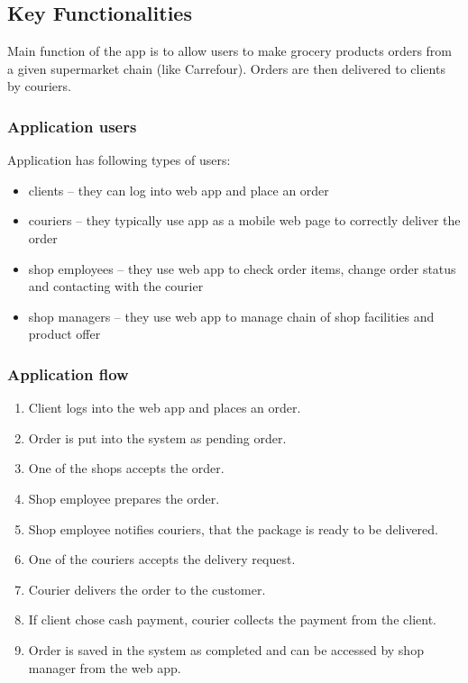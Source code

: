 \documentclass[../main.tex]{subfiles}
\begin{document}
\subsection{Key Functionalities}

Main function of the app is to allow users to make grocery products orders from a given supermarket chain (like Carrefour). Orders are then delivered to clients by couriers.

\subsubsection{Application users}
\vspace{3mm}
Application has following types of users:
\begin{itemize}
    \item clients -- they can log into web app and place an order
    \item couriers -- they typically use app as a mobile web page to correctly deliver the order 
    \item shop employees -- they use web app to check order items, change order status and contacting with the courier
    \item shop managers -- they use web app to manage chain of shop facilities and product offer
\end{itemize}

\subsubsection{Application flow}

\vspace{3mm}
\begin{enumerate}
    \item Client logs into the web app and places an order.
    \item Order is put into the system as pending order.
    \item One of the shops accepts the order.
    \item Shop employee prepares the order.
    \item Shop employee notifies couriers, that the package is ready to be delivered.
    \item One of the couriers accepts the delivery request.
    \item Courier delivers the order to the customer.
    \item If client chose cash payment, courier collects the payment from the client.
    \item Order is saved in the system as completed and can be accessed by shop manager from the web app.
\end{enumerate}
\end{document}

